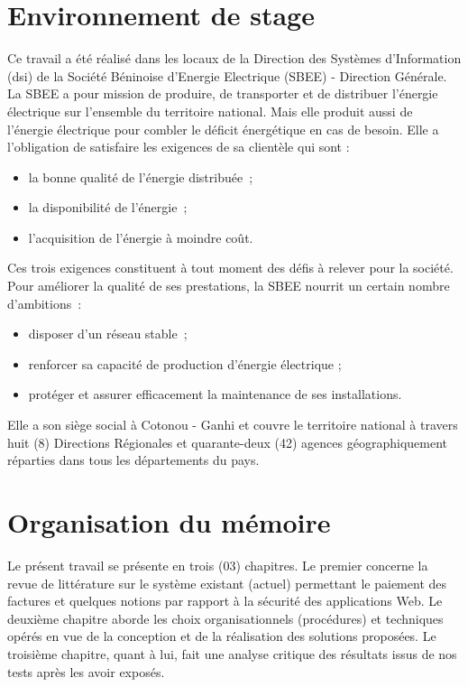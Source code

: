     \section{Environnement de stage}
      \small{
	Ce travail a \'et\'e r\'ealis\'e dans les locaux de la Direction des Syst\`emes d'Information (\gls{dsi}) de la Soci\'et\'e B\'eninoise d'Energie Electrique (SBEE) - Direction G\'en\'erale. La SBEE a pour mission de produire, de transporter et de distribuer l’énergie électrique sur l’ensemble du territoire national. Mais elle produit aussi de l’énergie électrique pour combler le déficit énergétique en cas de besoin. Elle a l’obligation de satisfaire les exigences de sa clientèle qui sont :
	\begin{itemize}
	   \item la bonne qualité de l’énergie distribuée ;
	   \item la disponibilité de l’énergie ;
	   \item l’acquisition de l’énergie à moindre coût.
	\end{itemize}
	Ces trois exigences constituent à tout moment des défis à relever pour la société. Pour améliorer la qualité de ses prestations, la SBEE nourrit un certain nombre d’ambitions :
	\begin{itemize}
	  \item disposer d’un réseau stable ;
	  \item renforcer sa capacité de production d’énergie électrique ;
	  \item protéger et assurer efficacement la maintenance de ses installations.
	\end{itemize}
	Elle a son siège social à Cotonou - Ganhi et couvre le territoire national à travers huit (8) Directions Régionales et quarante-deux (42) agences géographiquement réparties dans tous les départements du pays.
      }
      
    \section{Organisation du mémoire}
	\small{
	  Le présent travail se présente en trois (03) chapitres. Le premier concerne la revue de littérature sur le syst\`eme existant (actuel) permettant le paiement des factures et quelques notions par rapport \`a la s\'ecurit\'e des applications Web. Le deuxième chapitre aborde les choix organisationnels (proc\'edures) et techniques opérés en vue de la conception et de la réalisation des solutions proposées. Le troisième chapitre, quant à lui, fait une analyse critique des résultats issus de nos tests après les avoir exposés.
	}


